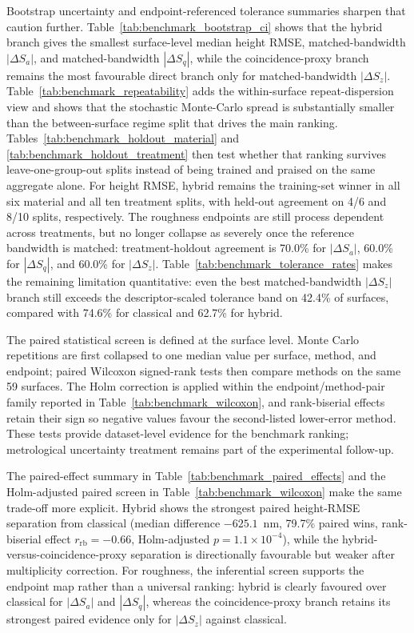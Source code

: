 \documentclass[photonics,article,submit,pdftex,moreauthors]{Definitions/mdpi}
\begin{document}
Bootstrap uncertainty and endpoint-referenced tolerance summaries sharpen that caution further. Table~\ref{tab:benchmark_bootstrap_ci} shows that the hybrid branch gives the smallest surface-level median height RMSE, matched-bandwidth $|\Delta S_a|$, and matched-bandwidth $|\Delta S_q|$, while the coincidence-proxy branch remains the most favourable direct branch only for matched-bandwidth $|\Delta S_z|$. Table~\ref{tab:benchmark_repeatability} adds the within-surface repeat-dispersion view and shows that the stochastic Monte-Carlo spread is substantially smaller than the between-surface regime split that drives the main ranking. Tables~\ref{tab:benchmark_holdout_material} and \ref{tab:benchmark_holdout_treatment} then test whether that ranking survives leave-one-group-out splits instead of being trained and praised on the same aggregate alone. For height RMSE, hybrid remains the training-set winner in all six material and all ten treatment splits, with held-out agreement on 4/6 and 8/10 splits, respectively. The roughness endpoints are still process dependent across treatments, but no longer collapse as severely once the reference bandwidth is matched: treatment-holdout agreement is 70.0\% for $|\Delta S_a|$, 60.0\% for $|\Delta S_q|$, and 60.0\% for $|\Delta S_z|$. Table~\ref{tab:benchmark_tolerance_rates} makes the remaining limitation quantitative: even the best matched-bandwidth $|\Delta S_z|$ branch still exceeds the descriptor-scaled tolerance band on 42.4\% of surfaces, compared with 74.6\% for classical and 62.7\% for hybrid.

The paired statistical screen is defined at the surface level. Monte Carlo repetitions are first collapsed to one median value per surface, method, and endpoint; paired Wilcoxon signed-rank tests then compare methods on the same 59 surfaces. The Holm correction is applied within the endpoint/method-pair family reported in Table~\ref{tab:benchmark_wilcoxon}, and rank-biserial effects retain their sign so negative values favour the second-listed lower-error method. These tests provide dataset-level evidence for the benchmark ranking; metrological uncertainty treatment remains part of the experimental follow-up.

The paired-effect summary in Table~\ref{tab:benchmark_paired_effects} and the Holm-adjusted paired screen in Table~\ref{tab:benchmark_wilcoxon} make the same trade-off more explicit. Hybrid shows the strongest paired height-RMSE separation from classical (median difference $-625.1$~nm, 79.7\% paired wins, rank-biserial effect $r_\mathrm{rb}=-0.66$, Holm-adjusted $p=1.1\times10^{-4}$), while the hybrid-versus-coincidence-proxy separation is directionally favourable but weaker after multiplicity correction. For roughness, the inferential screen supports the endpoint map rather than a universal ranking: hybrid is clearly favoured over classical for $|\Delta S_a|$ and $|\Delta S_q|$, whereas the coincidence-proxy branch retains its strongest paired evidence only for $|\Delta S_z|$ against classical.
\end{document}
